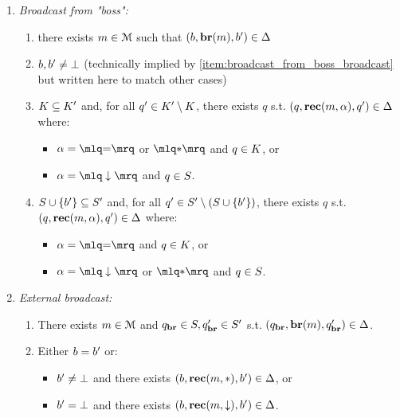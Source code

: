 \begin{definition}
\begin{enumerate}
	\item \emph{Broadcast from "boss":}
	\begin{enumerate}[i]
		\item \label{item:broadcast_from_boss_broadcast} there exists $m \in \mathcal{M}$ such that $(\boss, \brone{m}, \boss') \in \transitions$
		
		\item\label{item:broadcast_from_boss_boss} $\boss, \boss' \ne \noboss$ (technically implied by \ref{item:broadcast_from_boss_broadcast} but written here to match other cases)

		\item\label{item:broadcast_from_boss_clique} 	$\clique \subseteq \clique'$ and, for all $q' \in \clique' \setminus \clique$, there exists $q$ s.t. $(q, \textbf{rec}(m, \alpha), q') \in \Delta$ where:
		\begin{itemize}
			\item $\anact = \quotemarks{\eqtestact}$ or $\quotemarks{\dummyact}$ and $q \in \clique$, or
			\item $\anact= \quotemarks{\enregact}$ and $q \in S$.
		\end{itemize}
				
		\item\label{item:broadcast_from_boss_covset} $\covset \cup \set{\boss'} \subseteq \covset'$ and, for all $q' \in \covset' \setminus (\covset \cup \set{\boss'})$, there exists $q$ s.t. $(q, \textbf{rec}(m, \alpha), q') \in \Delta$ where:
		\begin{itemize}
			\item  $\anact = \quotemarks{\eqtestact}$ and $q \in \clique$, or
			\item $\anact = \quotemarks{\enregact}$ or $\quotemarks{\dummyact}$ and $q \in S$.
		\end{itemize}
	\end{enumerate}


	\item \emph{External broadcast:}
	\begin{enumerate}[i]
		\item\label{item:external_broadcast_broadcast} There exists $m \in \mathcal{M}$ and $q_{\textbf{br}} \in S, q_{\textbf{br}}' \in S'$ s.t. $(q_{\textbf{br}}, \textbf{br}(m), q_{\textbf{br}}') \in \Delta$. 
	
		\item\label{item:external_broadcast_boss}Either $\boss = \boss'$ or:
		\begin{itemize} 
			\item $\boss' \ne \noboss$ and there exists $(\boss, \recone{\amessage}{\dummyact}, \boss') \in \transitions$, or
			\item $\boss' = \noboss$ and there exists $(\boss, \recone{\amessage}{\enregact}, \boss') \in \transitions$.
		\end{itemize}


\end{enumerate}
\end{enumerate}
\end{definition}
